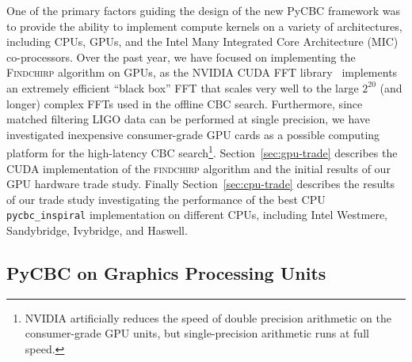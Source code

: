 One of the primary factors guiding the design of the new PyCBC framework was
to provide the ability to implement compute kernels on a variety of
architectures, including CPUs, GPUs, and the Intel Many Integrated Core
Architecture (MIC) co-processors. Over the past year, we have focused on
implementing the \textsc{Findchirp} algorithm on GPUs, as the NVIDIA CUDA FFT
library~\cite{cufft} implements an extremely efficient ``black box'' FFT that
scales very well to the large $2^{20}$ (and longer) complex FFTs used in the
offline CBC search. Furthermore, since matched filtering LIGO data
can be performed at single precision, we have investigated
inexpensive consumer-grade GPU cards as a possible computing platform for the
high-latency CBC search\footnote{NVIDIA artificially reduces the speed of
double precision arithmetic on the consumer-grade GPU units, but
single-precision arithmetic runs at full speed.}.  Section~\ref{sec:gpu-trade} describes the CUDA implementation of the
\textsc{findchirp} algorithm and the initial results of our GPU hardware trade
study. Finally Section~\ref{sec:cpu-trade} describes the results of our trade
study investigating the performance of the best CPU \texttt{pycbc\_inspiral}
implementation on different CPUs, including Intel Westmere, Sandybridge,
Ivybridge, and Haswell.

\vspace*{-10pt}
\subsection{PyCBC on Graphics Processing Units}
\vspace*{-05pt}
\label{sec:gpu-trade}

